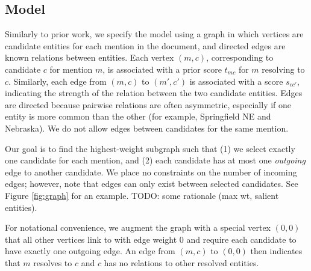\subsection{Model}

Similarly to prior work, we specify the model using a graph in which vertices are candidate entities for each mention in the document, and directed edges are known relations between entities. Each vertex $(m, c)$, corresponding to candidate $c$ for mention $m$, is associated with a prior score $t_{mc}$ for $m$ resolving to $c$.  Similarly, each edge from $(m,c)$ to $(m',c')$ is associated with a score $s_{cc'}$, indicating the strength of the relation between the  two candidate entities. 
Edges are directed because pairwise relations are often asymmetric, especially if one entity is more common than the other (for example, Springfield NE and Nebraska). We do not allow edges between candidates for the same mention. 

Our goal is to find the highest-weight subgraph such that (1) we select exactly one candidate for each mention, and (2) each candidate has at most one \emph{outgoing} edge to another candidate. We place no constraints on the number of incoming edges; however, note that edges can only exist between selected candidates. See Figure \ref{fig:graph} for an example. TODO: some rationale (max wt, salient entities).

For notational convenience, we augment the graph with a special vertex $(0, 0)$ that all other vertices link to with edge weight $0$ and require each candidate to have exactly one outgoing edge. An edge from $(m, c)$ to $(0, 0)$ then indicates that $m$ resolves to $c$ and $c$ has no relations to other resolved entities. 

